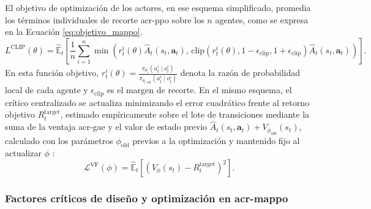 El objetivo de optimización de los actores, en ese esquema simplificado, promedia los términos individuales de recorte \acrshort{acr-ppo} sobre los $n$ agentes, como se expresa en la Ecuación \eqref{eq:objetivo_mappo}.
\begin{equation}
    L^{\text{CLIP}}(\theta) = \hat{\mathbb{E}}_t \left[ \frac{1}{n} \sum_{i=1}^n \min\left( r_t^i(\theta) \hat{A}_t(s_t, \mathbf{a}_t), \, \text{clip}(r_t^i(\theta), 1-\epsilon_{\mathrm{clip}}, 1+\epsilon_{\mathrm{clip}}) \hat{A}_t(s_t, \mathbf{a}_t) \right) \right].
    \label{eq:objetivo_mappo}
\end{equation}
En esta función objetivo, $r_t^i(\theta) = \frac{\pi_{\theta_i}(a_t^i \mid o_t^i)}{\pi_{\theta_{i,\text{old}}}(a_t^i \mid o_t^i)}$ denota la razón de probabilidad local de cada agente y $\epsilon_{\mathrm{clip}}$ es el margen de recorte. En el mismo esquema, el crítico centralizado se actualiza minimizando el error cuadrático frente al retorno objetivo $R_t^{\text{target}}$, estimado empíricamente sobre el lote de transiciones mediante la suma de la ventaja \acrshort{acr-gae} y el valor de estado previo $\hat{A}_t(s_t, \mathbf{a}_t) + V_{\phi_{\text{old}}}(s_t)$, calculado con los parámetros $\phi_{\text{old}}$ previos a la optimización y mantenido fijo al actualizar $\phi$ \cite{yu2022surprising,schulman2015high}:
\begin{equation}
    \mathcal{L}^{\text{VF}}(\phi) = \hat{\mathbb{E}}_t \left[ \left( V_\phi(s_t) - R_t^{\text{target}} \right)^2 \right].
    \label{eq:perdida_valor_mappo}
\end{equation}

\subsubsection[Factores críticos de diseño y optimización en MAPPO]{Factores críticos de diseño y optimización en \acrshort{acr-mappo}}

